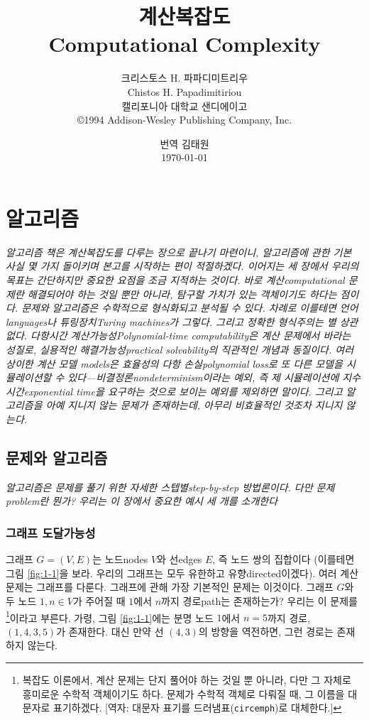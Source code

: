 \documentclass[a4paper,chapter,atbegshi,]{oblivoir}
\title{계산복잡도\\Computational Complexity}
\author{크리스토스 H. 파파디미트리우\\
Chistos H. Papadimitiriou\\
\small 캘리포니아 대학교 샌디에이고\\
\small \copyright 1994 Addison-Wesley Publishing Company, Inc.}
\date{번역 김태원\\\today}
\begin{document}
\begin{titlingpage}
  \maketitle
\end{titlingpage}
\frontmatter
\tableofcontents
\mainmatter
\renewcommand{\partpageend}{}
\part{알고리즘}
\vspace{5\baselineskip}\noindent
\emph{알고리즘 책은 계산복잡도를 다루는 장으로 끝나기 마련이니, 알고리즘에 관한
기본 사실 몇 가지 돌이키며 본고를 시작하는 편이 적절하겠다. 이어지는 세 장에서
우리의 목표는 간단하지만 중요한 요점을 조금 지적하는 것이다. 바로 
계산{\footnotesize computational} 문제란 해결되어야 하는 것일 뿐만 아니라, 탐구할
가치가 있는 객체이기도 하다는 점이다. 문제와 알고리즘은 수학적으로 형식화되고 
분석될 수 있다. 차례로 이를테면 언어{\footnotesize languages}나 
튜링장치{\footnotesize Turing machines}가 그렇다. 그리고 정확한 형식주의는 별
상관 없다. 다항시간 계산가능성{\footnotesize Polynomial-time computability}은
계산 문제에서 바라는 성질로, 실용적인 해결가능성{\footnotesize practical
solvability}의 직관적인 개념과 동질이다. 여러 상이한 계산 모델{\footnotesize
models}은 효율성의 다항 손실{\footnotesize polynomial loss}로 또 다른 모델을 
시뮬레이션할 수 있다---비결정론{\footnotesize nondeterminism}이라는 예외, 즉 제 
시뮬레이션에 지수시간{\footnotesize exponential time}을 요구하는 것으로 보이는 
예외를 제외하면 말이다. 그리고 알고리즘을 아예 지니지 않는 문제가 존재하는데, 
아무리 비효율적인 것조차 지니지 않는다.
}
\cleardoublepage
\chapter{문제와 알고리즘}
\emph{알고리즘은 문제를 풀기 위한 자세한 스텝별{\footnotesize step-by-step}
방법론이다. 다만 문제{\footnotesize problem}란 뭔가? 우리는 이 장에서 
중요한 예시 세 개를 소개한다}
\section{그래프 도달가능성}
그래프 $G=(V,E)$는 노드{\footnotesize nodes} $V$와 선{\footnotesize edges}
$E$, 즉 노드 쌍의 집합이다 (이를테면 그림 \ref{fig:1-1}을 보라. 우리의 그래프는
모두 유한하고 유향{\footnotesize directed}이겠다). 여러 계산 문제는 그래프를
다룬다. 그래프에 관해 가장 기본적인 문제는 이것이다. 그래프 $G$와 두 노드
$1,n\in V$가 주어질 때 $1$에서 $n$까지 경로{\footnotesize path}는 존재하는가?
우리는 이 문제를 \footnote[2]{복잡도 이론에서, 계산 문제는 단지 풀어야 하는 것일 뿐
아니라, 다만 그 자체로 흥미로운 수학적 객체이기도 하다. 문제가 수학적 객체로
다뤄질 때, 그 이름을 대문자로 표기하겠다. [역자: 대문자 표기를 
드러냄표(\texttt{circemph})로 대체한다.]}이라고 부른다. 가령, 그림 
\ref{fig:1-1}에는 분명 노드 $1$에서 $n=5$까지 경로, $(1,4,3,5)$가 존재한다. 
대신 만약 선 $(4,3)$의 방향을 역전하면, 그런 경로는 존재하지 않는다. 
\end{document}
